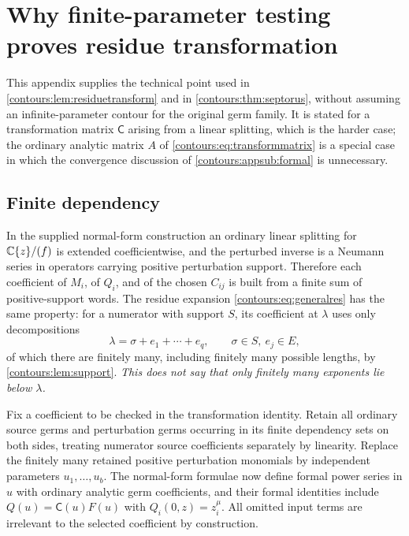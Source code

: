 \documentclass[11pt,letterpaper]{article}
\theoremstyle{definition}
\theoremstyle{remark}
\numberwithin{equation}{section}
\begin{document}
\section{Why finite-parameter testing proves residue transformation}
\label{contours:app:transform}

This appendix supplies the technical point used in
\cref{contours:lem:residuetransform} and in \cref{contours:thm:septorus}, without
assuming an infinite-parameter contour for the original germ family. It is stated for
a transformation matrix $\mathsf C$ arising from a linear splitting, which is the
harder case; the ordinary analytic matrix $A$ of
\eqref{contours:eq:transformmatrix} is a special case in which the convergence
discussion of \cref{contours:appsub:formal} is unnecessary.

\subsection{Finite dependency}
In the supplied normal-form construction an ordinary linear splitting for
$\mathbb C\{z\}/(f)$ is extended coefficientwise, and the perturbed inverse is a Neumann
series in operators carrying positive perturbation support. Therefore each
coefficient of $M_i$, of $Q_i$, and of the chosen $C_{ij}$ is built from a finite sum
of positive-support words. The residue expansion
\eqref{contours:eq:generalres} has the same property: for a numerator with support
$S$, its coefficient at $\lambda$ uses only decompositions
\[
  \lambda=\sigma+e_1+\cdots+e_q,\qquad\sigma\in S,\ e_j\in E,
\]
of which there are finitely many, including finitely many possible lengths, by
\cref{contours:lem:support}. \emph{This does not say that only finitely many
exponents lie below $\lambda$.}

Fix a coefficient to be checked in the transformation identity. Retain all ordinary
source germs and perturbation germs occurring in its finite dependency sets on both
sides, treating numerator source coefficients separately by linearity. Replace the
finitely many retained positive perturbation monomials by independent parameters
$u_1,\ldots,u_b$. The normal-form formulae now define formal power series in $u$ with
ordinary analytic germ coefficients, and their formal identities include
$Q(u)=\mathsf C(u)F(u)$ with $Q_i(0,z)=z_i^\mu$. All omitted input terms are
irrelevant to the selected coefficient by construction.
\end{document}
